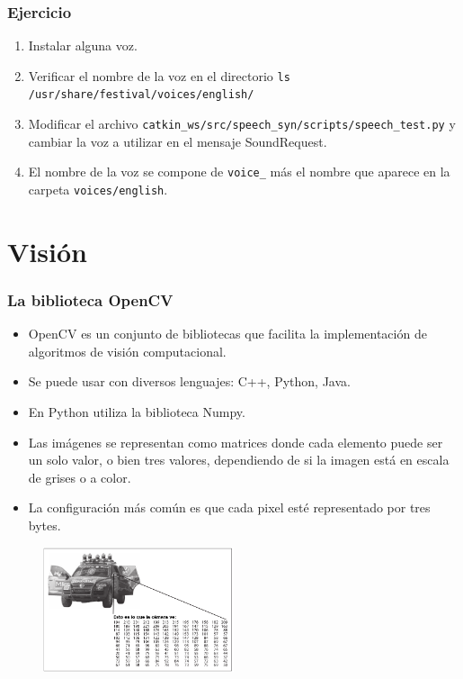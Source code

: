 \documentclass[10pt,spanish,aspectratio=1610]{beamer}
\begin{document}
\begin{frame}\frametitle{Ejercicio}
  \begin{enumerate}
  \item Instalar alguna voz.
  \item Verificar el nombre de la voz en el directorio \texttt{ls /usr/share/festival/voices/english/}
  \item Modificar el archivo \texttt{catkin\_ws/src/speech\_syn/scripts/speech\_test.py} y cambiar la voz a utilizar en el mensaje SoundRequest.
  \item El nombre de la voz se compone de \texttt{voice\_} más el nombre que aparece en la carpeta \texttt{voices/english}. 
  \end{enumerate}
\end{frame}

\section{Visión}
\begin{frame}\frametitle{La biblioteca OpenCV}
  \begin{itemize}
  \item OpenCV es un conjunto de bibliotecas que facilita la implementación de algoritmos de visión computacional.
  \item Se puede usar con diversos lenguajes: C++, Python, Java.
  \item En Python utiliza la biblioteca Numpy.
  \item Las imágenes se representan como matrices donde cada elemento puede ser un solo valor, o bien tres valores, dependiendo de si la imagen está en escala de grises o a color.
  \item La configuración más común es que cada pixel esté representado por tres bytes.
  \end{itemize}
    \begin{figure}
      \centering
      \includegraphics[width=0.5\textwidth]{Figures/representation_image.png}
    \end{figure}
\end{frame}
\end{document}
